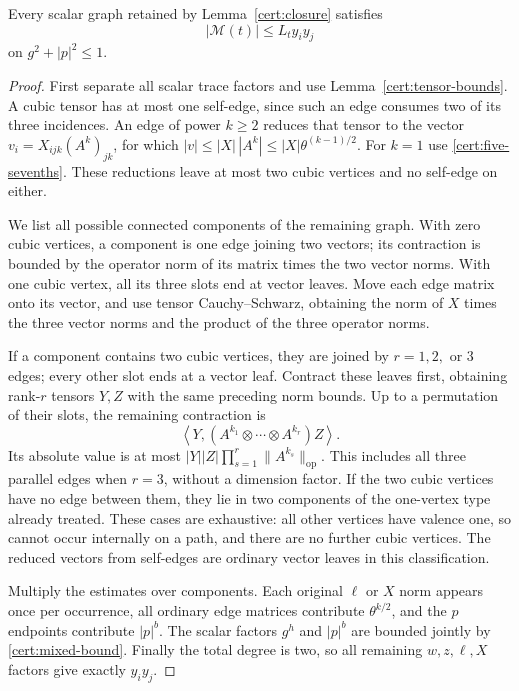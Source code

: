 \begin{lemma}\label{cert:graph-bound}
Every scalar graph retained by Lemma~\ref{cert:closure} satisfies
\begin{equation}\label{cert:monomial-bound}
 |\mathcal M(t)|\le L_t y_i y_j
\end{equation}
on $g^2+|p|^2\le1$.
\end{lemma}
\begin{proof}
First separate all scalar trace factors and use Lemma~\ref{cert:tensor-bounds}.
A cubic tensor has at most one self-edge, since such an edge consumes two
of its three incidences.  An edge of power $k\ge2$ reduces that tensor to
the vector $v_i=X_{ijk}(A^k)_{jk}$, for which
$|v|\le|X|\,|A^k|\le|X|\theta^{(k-1)/2}$.  For $k=1$ use
\eqref{cert:five-sevenths}.  These reductions leave at most two cubic
vertices and no self-edge on either.

We list all possible connected components of the remaining graph.
With zero cubic vertices, a component is one edge joining two vectors;
its contraction is bounded by the operator norm of its matrix times the
two vector norms.  With one cubic vertex, all its three slots end at vector
leaves.  Move each edge matrix onto its vector, and use tensor
Cauchy--Schwarz, obtaining the norm of $X$ times the three vector norms
and the product of the three operator norms.

If a component contains two cubic vertices, they are joined by $r=1,2,$
or $3$ edges; every other slot ends at a vector leaf.  Contract these leaves
first, obtaining rank-$r$ tensors $Y,Z$ with the same preceding norm
bounds.  Up to a permutation of their slots, the remaining contraction is
\[
 \left\langle Y,
      (A^{k_1}\otimes\cdots\otimes A^{k_r})Z\right\rangle.
\]
Its absolute value is at most
$|Y||Z|\prod_{s=1}^r\|A^{k_s}\|_{\mathrm{op}}$.  This includes all three
parallel edges when $r=3$, without a dimension factor.  If the two cubic
vertices have no edge between them, they lie in two components of the
one-vertex type already treated.  These cases are exhaustive: all other
vertices have valence one, so cannot occur internally on a path, and there
are no further cubic vertices.  The reduced vectors from self-edges are
ordinary vector leaves in this classification.

Multiply the estimates over components.  Each original $\ell$ or $X$
norm appears once per occurrence, all ordinary edge matrices contribute
$\theta^{k/2}$, and the $p$ endpoints contribute $|p|^b$.  The scalar
factors $g^h$ and $|p|^b$ are bounded jointly by
\eqref{cert:mixed-bound}.  Finally the total degree is two, so all remaining
$w,z,\ell,X$ factors give exactly $y_i y_j$.
\end{proof}

